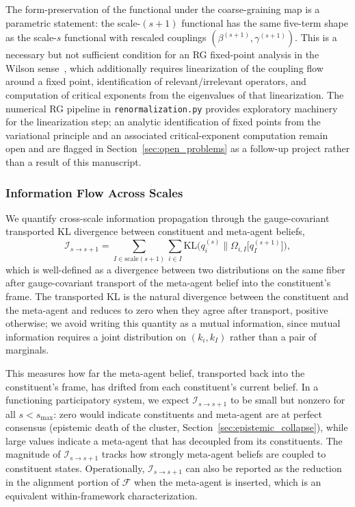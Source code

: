 \documentclass[11pt]{article}
\begin{document}
The form-preservation of the functional under the coarse-graining map is a parametric statement: the scale-$(s{+}1)$ functional has the same five-term shape as the scale-$s$ functional with rescaled couplings $(\beta^{(s+1)}, \gamma^{(s+1)})$. This is a necessary but not sufficient condition for an RG fixed-point analysis in the Wilson sense~\cite{Wilson1974}, which additionally requires linearization of the coupling flow around a fixed point, identification of relevant/irrelevant operators, and computation of critical exponents from the eigenvalues of that linearization. The numerical RG pipeline in \texttt{renormalization.py} provides exploratory machinery for the linearization step; an analytic identification of fixed points from the variational principle and an associated critical-exponent computation remain open and are flagged in Section~\ref{sec:open_problems} as a follow-up project rather than a result of this manuscript.

\subsubsection{Information Flow Across Scales}

We quantify cross-scale information propagation through the gauge-covariant transported KL divergence between constituent and meta-agent beliefs,
\begin{equation}
\mathcal{I}_{s \to s+1} = \sum_{I \in \mathrm{scale}(s+1)} \sum_{i \in I} \mathrm{KL}\big(q_i^{(s)} \big\| \Omega_{i,I}\big[q_I^{(s+1)}\big]\big),
\label{eq:cross_scale_information_flow}
\end{equation}
which is well-defined as a divergence between two distributions on the same fiber after gauge-covariant transport of the meta-agent belief into the constituent's frame. The transported KL is the natural divergence between the constituent and the meta-agent and reduces to zero when they agree after transport, positive otherwise; we avoid writing this quantity as a mutual information, since mutual information requires a joint distribution on $(k_i, k_I)$ rather than a pair of marginals.

This measures how far the meta-agent belief, transported back into the constituent's frame, has drifted from each constituent's current belief. In a functioning participatory system, we expect $\mathcal{I}_{s \to s+1}$ to be small but nonzero for all $s < s_{\max}$: zero would indicate constituents and meta-agent are at perfect consensus (epistemic death of the cluster, Section~\ref{sec:epistemic_collapse}), while large values indicate a meta-agent that has decoupled from its constituents. The magnitude of $\mathcal{I}_{s \to s+1}$ tracks how strongly meta-agent beliefs are coupled to constituent states. Operationally, $\mathcal{I}_{s \to s+1}$ can also be reported as the reduction in the alignment portion of $\mathcal{F}$ when the meta-agent is inserted, which is an equivalent within-framework characterization.
\end{document}
